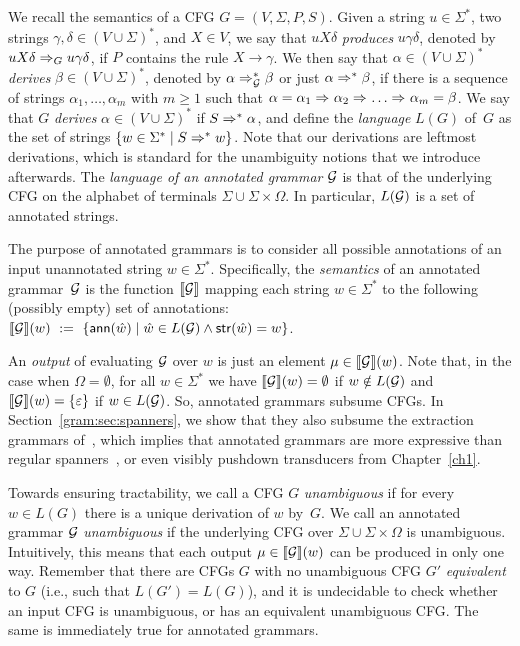 %
%
We recall the semantics of a CFG $G = (V, \Sigma, P, S)$.
Given a string $u \in \Sigma^*$, two strings $\gamma, \delta \in (V \cup
\Sigma)^*$, and $X \in V$, we say that $u X \delta$ \emph{produces} $u \gamma
\delta$, denoted by $u X \delta \Rightarrow_{G}u \gamma \delta$, if $P$ contains the rule
$X \rightarrow \gamma$. We then say that $\alpha \in (V \cup \Sigma)^*$
\emph{derives} $\beta \in (V \cup \Sigma)^*$, denoted by $\alpha \Rightarrow_{\mathcal{G}}^*
\beta$ or just $\alpha \Rightarrow_{}^* \beta$, if there is a sequence of strings $\alpha_1, \ldots, \alpha_m$ 
with $m\geq 1$
such that $\alpha = \alpha_1 \Rightarrow_{} \alpha_2 \Rightarrow_{} \ldots \Rightarrow_{} \alpha_m =
\beta$. We say that $G$ \emph{derives} $\alpha \in (V \cup \Sigma)^*$ if $S
\Rightarrow_{}^* \alpha$, and define the \emph{language} $L(G)$ of~$G$ as the set of
strings $\{w \in \Sigma^* \mid S \Rightarrow_{}^* w\}$. Note that our derivations
are leftmost derivations, which is standard for the unambiguity notions that we
introduce afterwards.
The \emph{language of an annotated grammar} $\mathcal{G}$ is that of the underlying CFG on the
alphabet of terminals $\Sigma \cup \Sigma \times \Omega$. In particular,
$L(\mathcal{G})$ is a set of annotated strings.

%
%
%
%
%
%
%
%
%
%
%
%
%
%
%
%
%
%
%
%
%
The purpose of annotated grammars is to consider all possible
annotations of an input unannotated string $w \in \Sigma^*$. 
%
%
%
%
%
Specifically, the \emph{semantics} of an annotated grammar~$\mathcal{G}$ is the
function ${\llbracket{\mathcal{G}}\rrbracket}$ mapping each string $w \in \Sigma^*$ to the following
(possibly empty) set of annotations:
$  {\llbracket{\mathcal{G}}\rrbracket}(w) \ := \ \{\textsf{ann}(\hat{w}) \mid \hat{w} \in
L(\mathcal{G}) \wedge \mathsf{str}(\hat{w}) = w\}$.

An \emph{output} of evaluating $\mathcal{G}$ over $w$ is just an element $\mu \in
{\llbracket{\mathcal{G}}\rrbracket}(w)$.
Note that, in the case when $\Omega = \emptyset$, for all $w \in \Sigma^*$ we have ${\llbracket{\mathcal{G}}\rrbracket}(w) =
\emptyset$ if $w \notin L(\mathcal{G})$ and ${\llbracket{\mathcal{G}}\rrbracket}(w) = \{\varepsilon\}$ if $w \in
L(\mathcal{G})$. So, annotated grammars subsume CFGs. In Section~\ref{gram:sec:spanners}, we show that they also subsume the extraction grammars of~\cite{Peterfreund21}, which implies that annotated grammars are more expressive than regular spanners~\cite{FlorenzanoRUVV18,amarilli2020constant}, or even visibly
pushdown transducers from Chapter~\ref{ch1}.

%
%
%
%
%


%

Towards ensuring tractability, we call a CFG $G$ \emph{unambiguous} if for every
$w \in L(G)$ there is a unique derivation of $w$ by~$G$. We call an annotated
grammar
$\mathcal{G}$ {\em unambiguous} if the underlying CFG over $\Sigma
\cup \Sigma\times\Omega$ is unambiguous.
%
Intuitively, this means that each output $\mu \in {\llbracket{\mathcal{G}}\rrbracket}(w)$ can be produced
in only one way.
%
%
%
%
%
Remember that there are CFGs $G$ with no unambiguous CFG $G'$ 
\emph{equivalent} to $G$ (i.e., such that $L(G') = L(G)$), and it is undecidable to check
whether an input CFG is unambiguous, or has an equivalent unambiguous CFG. The same
is immediately true for annotated grammars.
%
%
%
%
%








